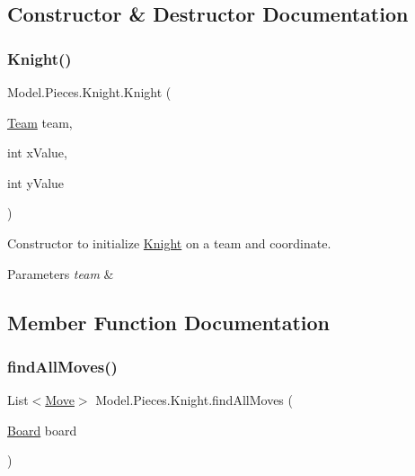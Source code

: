 \subsection{Constructor \& Destructor Documentation}
\hypertarget{class_model_1_1_pieces_1_1_knight_a8e99ebaed34bfc3465a5d577fb0692a9}{}\label{class_model_1_1_pieces_1_1_knight_a8e99ebaed34bfc3465a5d577fb0692a9} 
\subsubsection{\texorpdfstring{Knight()}{Knight()}}
{\footnotesize\ttfamily Model.\+Pieces.\+Knight.\+Knight (\begin{DoxyParamCaption}\item[{\hyperlink{class_model_1_1_team}{Team}}]{team,  }\item[{int}]{x\+Value,  }\item[{int}]{y\+Value }\end{DoxyParamCaption})}

Constructor to initialize \hyperlink{class_model_1_1_pieces_1_1_knight}{Knight} on a team and coordinate. 
\begin{DoxyParams}{Parameters}
{\em team} & \\
\hline
\end{DoxyParams}


\subsection{Member Function Documentation}
\hypertarget{class_model_1_1_pieces_1_1_knight_ab020b621de20f10e1e9c753d9cd71342}{}\label{class_model_1_1_pieces_1_1_knight_ab020b621de20f10e1e9c753d9cd71342} 
\subsubsection{\texorpdfstring{find\+All\+Moves()}{findAllMoves()}}
{\footnotesize\ttfamily List$<$\hyperlink{class_model_1_1_move}{Move}$>$ Model.\+Pieces.\+Knight.\+find\+All\+Moves (\begin{DoxyParamCaption}\item[{\hyperlink{class_model_1_1_board}{Board}}]{board }\end{DoxyParamCaption})}

